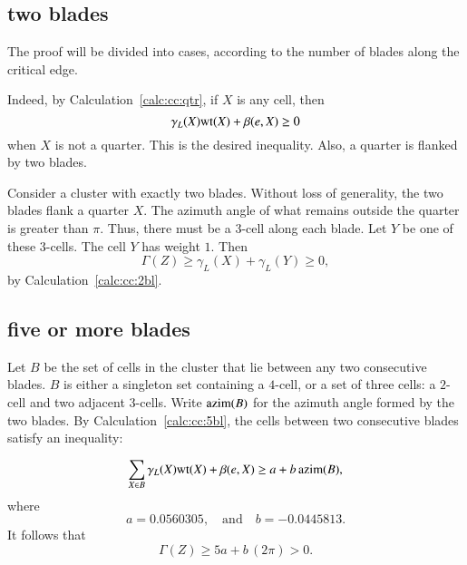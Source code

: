 \subsection{two blades}

The proof will be divided into cases, according to the number of blades along the critical edge.

 Indeed,
by Calculation~\ref{calc:cc:qtr}, 
 if $X$ is any cell, then %
\begin{displaymath}
 \gamma_L(X) {\operatorname{wt}}(X) + \beta(e,X)\ge 0
\end{displaymath} 
when $X$ is not a quarter.  This is the desired inequality.  Also, a quarter is flanked by two blades.

Consider a cluster with exactly two blades.
Without loss of generality, the two blades flank a quarter
$X$. 
The azimuth angle of what remains outside the quarter
is greater than $\pi$.  Thus, there must be a $3$-cell
along each blade.  Let $Y$ be one of these $3$-cells.
The cell $Y$ has weight $1$.
Then 
\begin{equation}\label{eqn:34}
\Gamma(Z)\ge \gamma_L(X)+\gamma_L(Y)\ge 0,
\end{equation}
by Calculation~\ref{calc:cc:2bl}.
%
%




\subsection{five or more blades}

Let $B$ be the set of cells in the cluster that lie between any two consecutive blades.  $B$ is either a singleton set containing a $4$-cell, or a set of three cells: a $2$-cell and two adjacent $3$-cells.  Write ${\operatorname{azim}}(B)$ for the azimuth angle formed by the two blades.   By Calculation~\ref{calc:cc:5bl}, the cells between two consecutive blades satisfy an inequality: %

\begin{displaymath}
\sum_{X\in B} \gamma_L(X){\operatorname{wt}}(X) + \beta(e,X) \ge a + b\,{\operatorname{azim}}(B),
\end{displaymath}
where
\begin{displaymath}
a= 0.0560305, \quad\text{and}\quad  b= -0.0445813.
\end{displaymath}
It follows that
\begin{displaymath}
\Gamma(Z) \ge 5 a + b\, (2\pi) > 0.
\end{displaymath}

